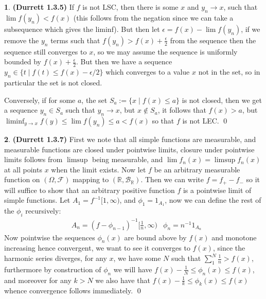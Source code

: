 \documentclass[10.5pt]{article}
\theoremstyle{definition}
\newtheorem{pb}{}
\newcommand{\set}[1]{\{#1\}}
\begin{document}
    \begin{pb}\textbf{(Durrett 1.3.5)}
        If \(f\) is not LSC, then there is some \(x\) and \(y_n \to x\), such that \(\lim f(y_n) < f(x)\) (this follows from the negation since we can take a subsequence which gives the liminf). But then let \(\epsilon = f(x) - \lim f(y_n)\), if we remove the \(y_n\) terms such that \(f(y_n) > f(x) + \frac{\epsilon}{2}\) from the sequence then the sequence still converges to \(x\), so we may assume the sequence is uniformly bounded by \(f(x) + \frac{\epsilon}{2}\). But then we have a sequence \(y_n \in \set{t \mid f(t) \leq f(x) - \epsilon/2}\) which converges to a value \(x\) not in the set, so in particular the set is not closed.

        Conversely, if for some \(a\), the set \(S_a := \set{x \mid f(x) \leq a}\) is not closed, then we get a sequence \(y_n \in S_a\) such that \(y_n \to x\), but \(x \not \in S_a\), it follows that \(f(x) > a\), but \(\liminf_{y\to x}f(y) \leq \lim f(y_n) \leq a < f(x)\) so that \(f\) is not LEC. \qed
    \end{pb}
    \begin{pb} \textbf{(Durrett 1.3.7)}
        First we note that all simple functions are measurable, and measurable functions are closed under pointwise limits, closure under pointwise limits follows from \(\limsup\) being measurable, and \(\lim f_n(x) = \limsup f_n(x)\) at all points \(x\) when the limit exists. Now let \(f\) be an arbitrary measurable function on \((\Omega,\mathcal{F})\) mapping to \((\mathbb{R},\mathcal{B}_\mathbb{R})\). Then we can write \(f = f_+ - f_-\) so it will suffice to show that an arbitrary positive function \(f\) is a pointwise limit of simple functions. Let \(A_1 = f^{-1}[1,\infty)\), and \(\phi_1 = 1_{A_1}\), now we can define the rest of the \(\phi_i\) recursively:
        \begin{align*}
            &A_n = (f - \phi_{n-1})^{-1}[\frac{1}{n},\infty) &\phi_n = n^{-1}1_{A_n}
        \end{align*} 
        Now pointwise the sequences \(\phi_n(x)\) are bound above by \(f(x)\) and monotone increasing hence convergent, we want to see it converges to \(f(x)\), since the harmonic series diverges, for any \(x\), we have some \(N\) such that \(\sum_1^N \frac{1}{n} > f(x)\), furthermore by construction of \(\phi_n\) we will have \(f(x) - \frac{1}{N} \leq \phi_n(x) \leq f(x)\), and moreover for any \(k > N\) we also have that \(f(x) - \frac{1}{k} \leq \phi_k(x) \leq f(x)\) whence convergence follows immediately. \qed
    \end{pb}
\end{document}
